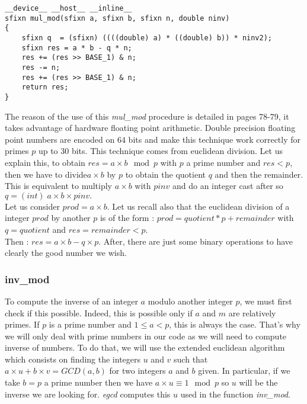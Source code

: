 \begin{verbatim}
__device__ __host__ __inline__ 
sfixn mul_mod(sfixn a, sfixn b, sfixn n, double ninv)
{
    sfixn q  = (sfixn) ((((double) a) * ((double) b)) * ninv2);
    sfixn res = a * b - q * n;
    res += (res >> BASE_1) & n;
    res -= n;
    res += (res >> BASE_1) & n;
    return res;
}
\end{verbatim}

The reason of the use of this \textit{mul\_mod} procedure is detailed in \cite{Wei} pages 78-79, it takes advantage of hardware floating point arithmetic. Double precision floating point numbers are encoded on $64$ bits and make this technique work correctly for primes $p$ up to $30$ bits. This technique comes from euclidean division. Let us explain this, to obtain $res = a \times b \mod p$ with $p$ a prime number and $res < p$, then  we have to divide$ a \times b$ by $p$ to obtain the quotient $q$ and then the remainder. This is equivalent to multiply $a \times b$ with $pinv$ and do an integer cast after so $q = (int)\; a \times b \times pinv.$\\
Let us consider $prod = a \times b$. Let us recall also that the euclidean division of a integer $prod$ by another $p$ is of the form : $prod = quotient * p + remainder$ with $q = quotient$ and $res = remainder < p$. \\

Then : $res = a\times b - q\times p$. After, there are just some binary operations to have clearly the good number we wish.

\subsubsection*{inv\_mod}
To compute the inverse of an integer $a$ modulo another integer $p$, we must first check if this possible. Indeed, this is possible only if $a$ and $m$ are relatively primes. If $p$ is a prime number and $1\leq a < p$, this is always the case. That's why we will only deal with prime numbers in our code as we will need to compute inverse of numbers. To do that, we will use the extended euclidean algorithm which consists on finding the integers $u$ and $v$ such that $a\times u + b \times v = GCD(a,b)$ for two integers $a$ and $b$ given. In particular, if we take $b = p$ a prime number then we have $a\times u \equiv 1 \mod p$ so $u$ will be the inverse we are looking for. \textit{egcd} computes this $u$ used in the function \textit{inv\_mod}.

